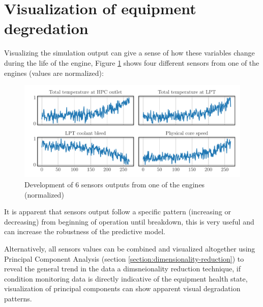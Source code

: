 \section{Visualization of equipment degredation}
Visualizing the simulation output can give a sense of how these variables change during the life of the engine, Figure \ref{fig:sensors-plot} shows four different sensors from one of the engines (values are normalized):

\begin{figure}[h]
    \centering
    \includegraphics[width=\linewidth]{figures/plots/sensors_plot.pdf}
    \caption{Development of 6 sensors outputs from one of the engines (normalized)}
    \label{fig:sensors-plot}
\end{figure}

It is apparent that sensors output follow a specific pattern (increasing or decreasing) from beginning of operation until breakdown, this is very useful and can increase the robustness of the predictive model.

Alternatively, all sensors values can be combined and visualized altogether using Principal Component Analysis (section \ref{section:dimensionality-reduction}) to reveal the general trend in the data a dimsneionality reduction technique, if condition monitoring data is directly indicative of the equipment health state, visualization of principal components can show apparent visual degradation patterns.

